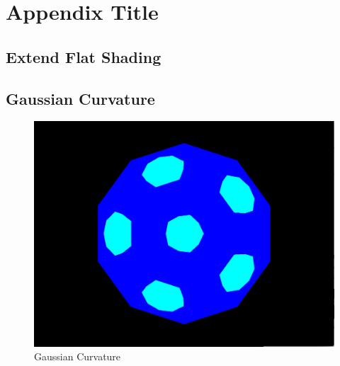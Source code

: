 \documentclass[12pt]{report}
\begin{document}
% 

\appendix
\chapter{Appendix Title}
% 

  \section{Extend Flat Shading}
\section{Gaussian Curvature}
\begin{figure}[!htb]
    \includegraphics[width=\linewidth]{gaussian-ball.png}
    \caption{Gaussian Curvature}\label{fig:gaussian-ball}
  \end{figure}
\end{document}
